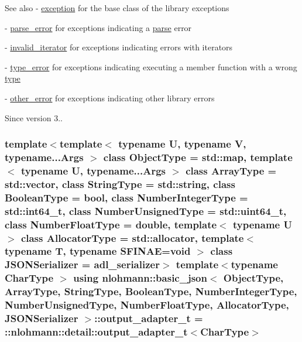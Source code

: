 \begin{DoxySeeAlso}{See also}
-\/ \hyperlink{classnlohmann_1_1basic__json_a9a0aced019cb1d65bb49703406c84970}{exception} for the base class of the library exceptions 

-\/ \hyperlink{classnlohmann_1_1basic__json_af1efc2468e6022be6e35fc2944cabe4d}{parse\+\_\+error} for exceptions indicating a \hyperlink{classnlohmann_1_1basic__json_a265a473e939184aa42655c9ccdf34e58}{parse} error 

-\/ \hyperlink{classnlohmann_1_1basic__json_ac13d32f7cbd02d616e71d8dc30dadcbf}{invalid\+\_\+iterator} for exceptions indicating errors with iterators 

-\/ \hyperlink{classnlohmann_1_1basic__json_a4010e8e268fefd86da773c10318f2902}{type\+\_\+error} for exceptions indicating executing a member function with a wrong \hyperlink{classnlohmann_1_1basic__json_a2b2d781d7f2a4ee41bc0016e931cadf7}{type} 

-\/ \hyperlink{classnlohmann_1_1basic__json_a3333a5a8714912adda33a35b369f7b3d}{other\+\_\+error} for exceptions indicating other library errors
\end{DoxySeeAlso}
\begin{DoxySince}{Since}
version 3.. 
\end{DoxySince}
\subsubsection[{\texorpdfstring{output\+\_\+adapter\+\_\+t}{output_adapter_t}}]{\setlength{\rightskip}{0pt plus 5cm}template$<$template$<$ typename U, typename V, typename...\+Args $>$ class Object\+Type = std\+::map, template$<$ typename U, typename...\+Args $>$ class Array\+Type = std\+::vector, class String\+Type  = std\+::string, class Boolean\+Type  = bool, class Number\+Integer\+Type  = std\+::int64\+\_\+t, class Number\+Unsigned\+Type  = std\+::uint64\+\_\+t, class Number\+Float\+Type  = double, template$<$ typename U $>$ class Allocator\+Type = std\+::allocator, template$<$ typename T, typename S\+F\+I\+N\+A\+E=void $>$ class J\+S\+O\+N\+Serializer = adl\+\_\+serializer$>$ template$<$typename Char\+Type $>$ using {\bf nlohmann\+::basic\+\_\+json}$<$ Object\+Type, Array\+Type, String\+Type, Boolean\+Type, Number\+Integer\+Type, Number\+Unsigned\+Type, Number\+Float\+Type, Allocator\+Type, J\+S\+O\+N\+Serializer $>$\+::{\bf output\+\_\+adapter\+\_\+t} =  \+::{\bf nlohmann\+::detail\+::output\+\_\+adapter\+\_\+t}$<$Char\+Type$>$\hspace{0.3cm}{\ttfamily [private]}}\hypertarget{classnlohmann_1_1basic__json_a5f17a041e3338ea006eaac2d89446c0d}{}\label{classnlohmann_1_1basic__json_a5f17a041e3338ea006eaac2d89446c0d}
